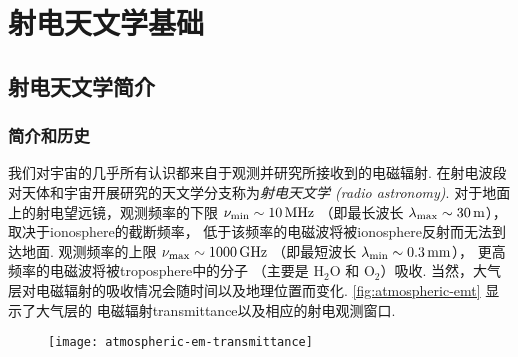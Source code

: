 

\chapter{射电天文学基础}
\label{chap:radio-astronomy}

\section{射电天文学简介}
\label{sec:radio-astro-intro}

\subsection{简介和历史}

我们对宇宙的几乎所有认识都来自于观测并研究所接收到的电磁辐射.
在射电波段对天体和宇宙开展研究的天文学分支称为\emph{射电天文学 (radio astronomy)}.
对于地面上的射电望远镜，观测频率的下限 $\nu_{\R{min}} \sim \SI{10}{\MHz}$
（即最长波长 $\lambda_{\mathrm{max}} \sim \SI{30}{\meter}$），
取决于\ac{ionosphere}的截断频率，
低于该频率的电磁波将被\ac{ionosphere}反射而无法到达地面.
观测频率的上限 $\nu_{\R{max}} \sim \SI{1000}{\GHz}$
（即最短波长 $\lambda_{\R{min}} \sim \SI{0.3}{\mm}$），
更高频率的电磁波将被\ac{troposphere}中的分子
（主要是 $\mathrm{H_2 O}$ 和 $\mathrm{O_2}$）吸收.
当然，大气层对电磁辐射的吸收情况会随时间以及地理位置而变化.
\autoref{fig:atmospheric-emt} 显示了大气层的
电磁辐射\ac{transmittance}以及相应的射电观测窗口.

\begin{figure}[htp]
  \centering
  \texttt{[image: atmospheric-em-transmittance]}
  \label{fig:atmospheric-emt}
\end{figure}

